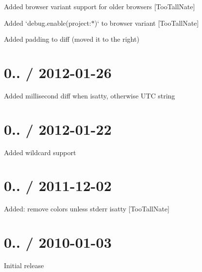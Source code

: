 \begin{DoxyItemize}
\item Added browser variant support for older browsers \mbox{[}Too\+Tall\+Nate\mbox{]}
\item Added `debug.enable(\textquotesingle{}project\+:$\ast$\textquotesingle{})` to browser variant \mbox{[}Too\+Tall\+Nate\mbox{]}
\item Added padding to diff (moved it to the right)
\end{DoxyItemize}

\section*{0.. / 2012-\/01-\/26 }


\begin{DoxyItemize}
\item Added millisecond diff when isatty, otherwise U\+T\+C string
\end{DoxyItemize}

\section*{0.. / 2012-\/01-\/22 }


\begin{DoxyItemize}
\item Added wildcard support
\end{DoxyItemize}

\section*{0.. / 2011-\/12-\/02 }


\begin{DoxyItemize}
\item Added\+: remove colors unless stderr isatty \mbox{[}Too\+Tall\+Nate\mbox{]}
\end{DoxyItemize}

\section*{0.. / 2010-\/01-\/03 }


\begin{DoxyItemize}
\item Initial release 
\end{DoxyItemize}